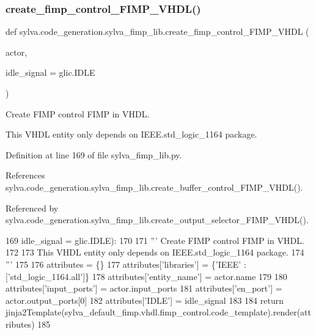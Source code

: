 \subsubsection{\texorpdfstring{create\+\_\+fimp\+\_\+control\+\_\+\+F\+I\+M\+P\+\_\+\+V\+H\+D\+L()}{create\_fimp\_control\_FIMP\_VHDL()}}
{\footnotesize\ttfamily def sylva.\+code\+\_\+generation.\+sylva\+\_\+fimp\+\_\+lib.\+create\+\_\+fimp\+\_\+control\+\_\+\+F\+I\+M\+P\+\_\+\+V\+H\+DL (\begin{DoxyParamCaption}\item[{}]{actor,  }\item[{}]{idle\+\_\+signal = {\ttfamily glic.IDLE} }\end{DoxyParamCaption})}

\begin{DoxyVerb}Create FIMP control FIMP in VHDL.

This VHDL entity only depends on IEEE.std_logic_1164 package.
\end{DoxyVerb}
 

Definition at line 169 of file sylva\+\_\+fimp\+\_\+lib.\+py.



References sylva.\+code\+\_\+generation.\+sylva\+\_\+fimp\+\_\+lib.\+create\+\_\+buffer\+\_\+control\+\_\+\+F\+I\+M\+P\+\_\+\+V\+H\+D\+L().



Referenced by sylva.\+code\+\_\+generation.\+sylva\+\_\+fimp\+\_\+lib.\+create\+\_\+output\+\_\+selector\+\_\+\+F\+I\+M\+P\+\_\+\+V\+H\+D\+L().


\begin{DoxyCode}
169     idle\_signal = glic.IDLE):
170 
171     \textcolor{stringliteral}{''' Create FIMP control FIMP in VHDL.}
172 \textcolor{stringliteral}{}
173 \textcolor{stringliteral}{    This VHDL entity only depends on IEEE.std\_logic\_1164 package.}
174 \textcolor{stringliteral}{    '''}
175 
176     attributes = \{\}
177     attributes[\textcolor{stringliteral}{'libraries'}] = \{\textcolor{stringliteral}{'IEEE'} : [\textcolor{stringliteral}{'std\_logic\_1164.all'}]\}
178     attributes[\textcolor{stringliteral}{'entity\_name'}] = actor.name
179 
180     attributes[\textcolor{stringliteral}{'input\_ports'}] = actor.input\_ports
181     attributes[\textcolor{stringliteral}{'en\_port'}] = actor.output\_ports[0]
182     attributes[\textcolor{stringliteral}{'IDLE'}] = idle\_signal
183 
184     \textcolor{keywordflow}{return} jinja2Template(sylva\_default\_fimp.vhdl.fimp\_control.code\_template).render(attributes)
185 
\end{DoxyCode}
\mbox{\label{namespacesylva_1_1code__generation_1_1sylva__fimp__lib_a6deb8050547dff049bdfca46b07ba242}} 
